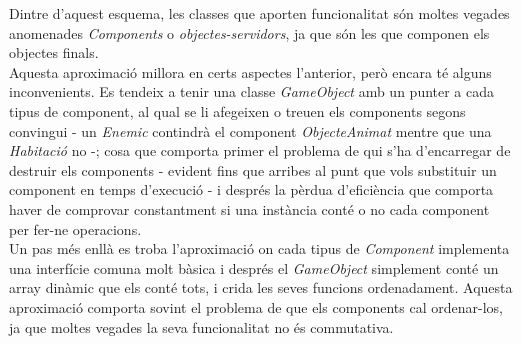 \begin{figure}
  \centering
  \hspace{0.08\textwidth}
\end{figure}

Dintre d'aquest esquema, les classes que aporten funcionalitat són moltes vegades anomenades {\em Components} o {\em objectes-servidors}, ja que són les que componen els objectes finals.
\\

Aquesta aproximació millora en certs aspectes l'anterior, però encara té alguns inconvenients. Es tendeix a tenir una classe {\em GameObject} amb un punter a cada tipus de component, al qual se li afegeixen o treuen els components segons convingui - un {\em Enemic} contindrà el component {\em ObjecteAnimat} mentre que una {\em Habitació} no -; cosa que comporta primer el problema de qui s'ha d'encarregar de destruir els components - evident fins que arribes al punt que vols substituir un component en temps d'execució - i després la pèrdua d'eficiència que comporta haver de comprovar constantment si una instància conté o no cada component per fer-ne operacions.
\\

Un pas més enllà es troba l'aproximació on cada tipus de {\em Component} implementa una interfície comuna molt bàsica i després el {\em GameObject} simplement conté un array dinàmic que els conté tots, i crida les seves funcions ordenadament. Aquesta aproximació comporta sovint el problema de que els components cal ordenar-los, ja que moltes vegades la seva funcionalitat no és commutativa.
\\

